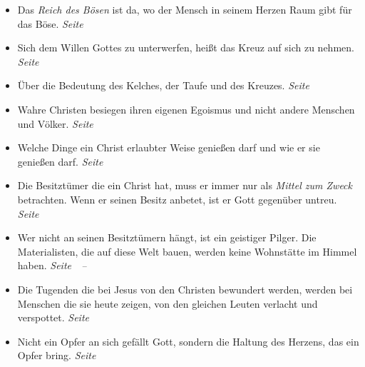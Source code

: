 \begin{itemize}
 \item Das \textit{Reich des Bösen} ist da, wo der Mensch in seinem Herzen Raum
gibt für das Böse.
 \dotfill \textit{Seite~\pageref{ref:03_04_reich_des_boesen}}\\

 \item Sich dem Willen Gottes zu unterwerfen, heißt das Kreuz auf sich zu
nehmen.
 \dotfill \textit{Seite~\pageref{ref:03_05_kreuz_auf_sich_nehmen}}\\

 \item Über die Bedeutung des Kelches, der Taufe und des Kreuzes.
 \dotfill \textit{Seite~\pageref{ref:04_04_kelch_taufe_kreuz}}\\

 \item Wahre Christen besiegen ihren eigenen Egoismus und nicht andere Menschen
und Völker.
 \dotfill \textit{Seite~\pageref{ref:04_05_besigen}}\\

 \item Welche Dinge ein Christ erlaubter Weise genießen darf und wie er sie
genießen darf.
 \dotfill \textit{Seite~\pageref{ref:04_07_vorteile}}\\

 \item Die Besitztümer die ein Christ hat, muss er immer nur als \textit{Mittel
zum Zweck} betrachten. Wenn er seinen Besitz anbetet, ist er Gott gegenüber
untreu.
 \dotfill \textit{Seite~\pageref{ref:04_07_vorteile}}\\

 \item Wer nicht an seinen Besitztümern hängt, ist ein geistiger Pilger. Die
Materialisten, die auf diese Welt bauen, werden keine Wohnstätte im Himmel
haben.
 \dotfill
 \textit{Seite~\pageref{ref:04_10_pilger}~--~\pageref{ref:04_10_pilger_ende}}\\

 \item Die Tugenden die bei Jesus von den Christen bewundert werden, werden bei
Menschen die sie heute zeigen, von den gleichen Leuten verlacht und verspottet.
 \dotfill \textit{Seite~\pageref{ref:04_10_pilger}}\\

 \item Nicht ein Opfer an sich gefällt Gott, sondern die Haltung des Herzens, das
ein Opfer bring.
 \dotfill \textit{Seite~\pageref{ref:04_13_opfer}}\\


\end{itemize}
